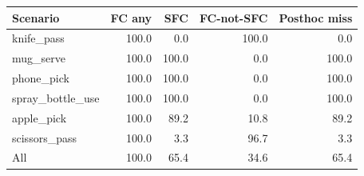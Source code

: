 \begin{tabular}{lrrrr}
\toprule
Scenario & FC any & SFC & FC-not-SFC & Posthoc miss \\
\midrule
knife\_pass & 100.0 & 0.0 & 100.0 & 0.0 \\
mug\_serve & 100.0 & 100.0 & 0.0 & 100.0 \\
phone\_pick & 100.0 & 100.0 & 0.0 & 100.0 \\
spray\_bottle\_use & 100.0 & 100.0 & 0.0 & 100.0 \\
apple\_pick & 100.0 & 89.2 & 10.8 & 89.2 \\
scissors\_pass & 100.0 & 3.3 & 96.7 & 3.3 \\
\midrule
All & 100.0 & 65.4 & 34.6 & 65.4 \\
\bottomrule
\end{tabular}
